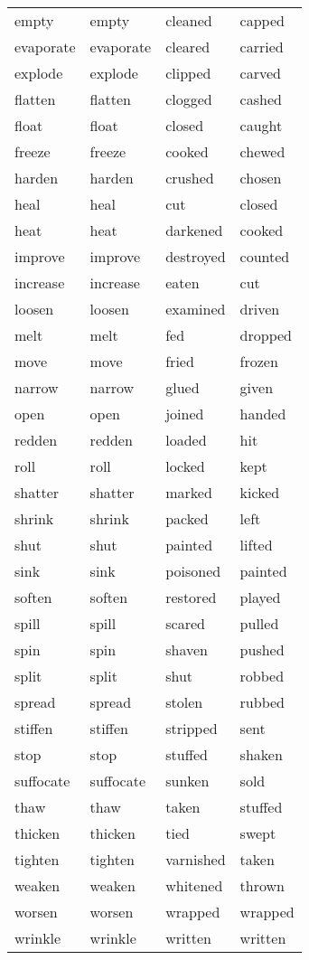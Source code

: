 \documentclass[output=paper]{langsci/langscibook}
\begin{document}
{\begin{longtable}{ *{4}{>{\raggedright\arraybackslash}p{}} }
empty     & empty     & cleaned    & capped\\
evaporate & evaporate & cleared    & carried\\
explode   & explode   & clipped    & carved\\
flatten   & flatten   & clogged    & cashed\\
float     & float     & closed     & caught\\
freeze    & freeze    & cooked     & chewed\\
harden    & harden    & crushed    & chosen\\
heal      & heal      & cut        & closed\\
heat      & heat      & darkened   & cooked\\
improve   & improve   & destroyed  & counted\\
increase  & increase  & eaten      & cut\\
loosen    & loosen    & examined   & driven\\
melt      & melt      & fed        & dropped\\
move      & move      & fried      & frozen\\
narrow    & narrow    & glued      & given\\
open      & open      & joined     & handed\\
redden    & redden    & loaded     & hit\\
roll      & roll      & locked     & kept\\
shatter   & shatter   & marked    & kicked\\
shrink    & shrink    & packed    & left\\
shut      & shut      & painted   & lifted\\
sink      & sink      & poisoned  & painted\\
soften    & soften    & restored  & played\\
spill     & spill     & scared    & pulled\\
spin      & spin      & shaven    & pushed\\
split     & split     & shut      & robbed\\
spread    & spread    & stolen    & rubbed\\
stiffen   & stiffen   & stripped  & sent\\
stop      & stop      & stuffed   & shaken\\
suffocate & suffocate & sunken    & sold\\
thaw      & thaw      & taken     & stuffed\\
thicken   & thicken   & tied      & swept\\
tighten   & tighten   & varnished & taken\\
weaken    & weaken    & whitened  & thrown\\
worsen    & worsen    & wrapped   & wrapped\\
wrinkle   & wrinkle   & written   & written\\
\end{longtable}}
\end{document}
